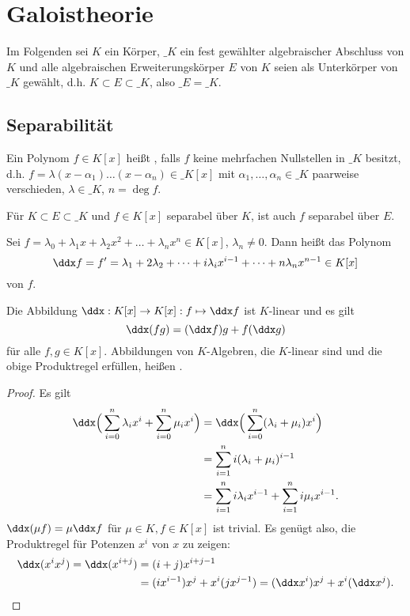 \chapter{Galoistheorie}


Im Folgenden sei $K$ ein Körper, $\_K$ ein fest gewählter algebraischer Abschluss von $K$ und alle algebraischen Erweiterungskörper $E$ von $K$ seien als Unterkörper von $\_K$ gewählt, d.h. $K \subset E \subset \_K$, also $\_E = \_K$.


\section{Separabilität}


\begin{df} \label{19.1-1}
	Ein Polynom $f \in K[x]$ heißt , falls $f$ keine mehrfachen Nullstellen in $\_K$ besitzt, d.h. $f = \lambda (x - \alpha_1) \dotsc (x - \alpha_n) \in \_K[x]$ mit $\alpha_1, \dotsc, \alpha_n \in \_K$ paarweise verschieden, $\lambda \in \_K$, $n = \deg f$.
	\begin{note}
		Für $K \subset E \subset \_K$ und $f \in K[x]$ separabel über $K$, ist auch $f$ separabel über $E$.
	\end{note}
\end{df}

\begin{df} \label{19.1-2}
	Sei $f = \lambda_0 + \lambda_1 x + \lambda_2 x^2 + \dotsc + \lambda_n x^n \in K[x]$, $\lambda_n \neq 0$.
	Dann heißt das Polynom
	\[
		\ddx f = f' = \lambda_1 + 2 \lambda_2 + \dotsb + i \lambda_i x^{i-1} + \dotsb + n \lambda_n x^{n-1}
		\in K[x]
	\]
	 von $f$.
\end{df}

\begin{lem}[Produktregel] \label{19.1-3}
	Die Abbildung $\ddx: K[x] \to K[x] : f \mapsto \ddx f$ ist $K$-linear und es gilt
	\[
		\ddx (fg) = (\ddx f) g + f (\ddx g)
	\]
	für alle $f, g \in K[x]$.
	Abbildungen von $K$-Algebren, die $K$-linear sind und die obige Produktregel erfüllen, heißen .
	\begin{proof}
		Es gilt
		\begin{align*}
			\ddx \Big(\sum_{i=0}^n \lambda_i x^i + \sum_{i=0}^{n} \mu_i x^i \Big)
			&= \ddx \Big(\sum_{i=0}^{n} (\lambda_i + \mu_i) x^i \Big) \\
			&= \sum_{i=1}^{n} i(\lambda_i + \mu_i)^{i-1} \\
			&= \sum_{i=1}^{n} i \lambda_i x^{i-1} + \sum_{i=1}^{n} i \mu_i x^{i-1}.
		\end{align*}
		$\ddx (\mu f) = \mu \ddx f$ für $\mu \in K, f \in K[x]$ ist trivial.
		Es genügt also, die Produktregel für Potenzen $x^i$ von $x$ zu zeigen:
		\begin{align*}
			\ddx(x^i x^j)
			= \ddx(x^{i+j})
			&= (i+j)x^{i+j-1} \\
			&= (i x^{i-1}) x^j + x^i (j x^{j-1})
			= (\ddx x^i) x^j + x^i (\ddx x^j).
		\end{align*}
	\end{proof}
\end{lem}

